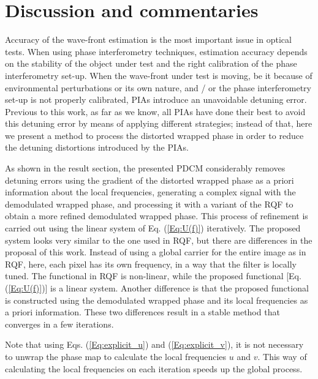\section{Discussion and commentaries}
Accuracy of the wave-front estimation is the most important issue in optical 
tests. When using phase interferometry techniques, estimation accuracy depends 
on the stability of the object under test and the right calibration of the 
phase 
interferometry set-up. When the wave-front under test is moving, be it because 
of environmental perturbations or its own nature, and / or the phase 
interferometry set-up is not properly calibrated, PIAs introduce an unavoidable 
detuning error. Previous to this work, as far as we know, all PIAs have done 
their best to avoid this detuning error by means of applying different 
strategies; instead of that, here we present a method to process the distorted 
wrapped phase in order to reduce the detuning distortions introduced by the 
PIAs.

As shown in the result section, the presented PDCM considerably 
removes detuning errors using the gradient of the distorted wrapped phase as a 
priori information about the local frequencies, generating a complex signal 
with the demodulated wrapped phase, and processing it with a variant of the RQF 
to obtain a more refined demodulated wrapped phase. This process of refinement 
is carried out using the linear system of Eq. (\ref{Eq:U(f)}) iteratively. The 
proposed system looks very similar to the one used in RQF, but there 
are differences in the proposal of this work. Instead of using a global 
carrier for the entire image as in RQF, here, each pixel has its own 
frequency, in a way that the filter is locally tuned. The functional in 
RQF is non-linear, while the proposed functional [Eq. (\ref{Eq:U(f)})] 
is a linear system. Another difference is that the proposed functional is 
constructed using the demodulated wrapped phase and its local frequencies as a 
priori information. These two differences result in a stable method that 
converges in a few iterations. 

Note that using Eqs. (\ref{Eq:explicit_u}) and (\ref{Eq:explicit_v}), it is 
not necessary to unwrap the phase map to calculate the local frequencies 
$u$ and $v$. This way of calculating the local frequencies on each 
iteration speeds up the global process.

